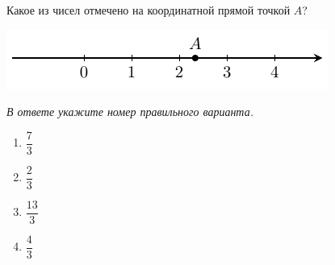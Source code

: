 Какое из чисел отмечено на координатной прямой точкой $A$?
\begin{center}
	\includegraphics{graphs/graph_1/graph_1}
\end{center}

\textit{В ответе укажите номер правильного варианта.}
\begin{multicols}{4}
	\begin{enumerate}[label=\arabic*)]
		\item $\dfrac{7}{3}$
		\item $\dfrac{2}{3}$
		\item $\dfrac{13}{3}$
		\item $\dfrac{4}{3}$
	\end{enumerate}
\end{multicols}